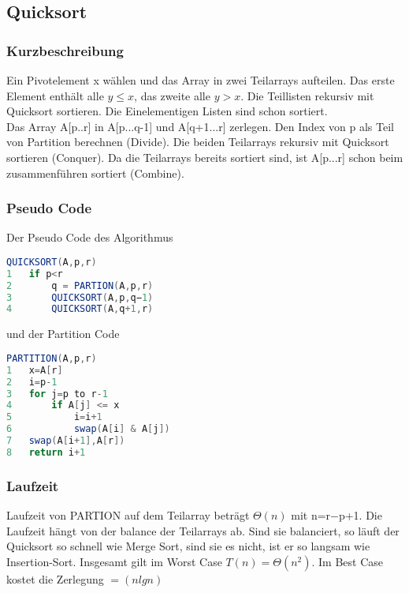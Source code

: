 \documentclass[jou,apacite]{apa6}
\begin{document}
\subsection{Quicksort}

\subsubsection{Kurzbeschreibung}
Ein Pivotelement x wählen und das Array in zwei Teilarrays aufteilen. Das erste Element enthält alle $y\le x$, das zweite alle $y>x$. Die Teillisten rekursiv mit Quicksort sortieren. Die Einelementigen Listen sind schon sortiert. \\
Das Array A[p..r] in A[p...q-1] und A[q+1...r] zerlegen. Den Index von p als Teil von Partition berechnen (Divide). Die beiden Teilarrays rekursiv mit Quicksort sortieren (Conquer). Da die Teilarrays bereits sortiert sind, ist A[p...r] schon beim zusammenführen sortiert (Combine). 

\subsubsection{Pseudo Code}
Der Pseudo Code des Algorithmus 
\begin{lstlisting}[language=Java]
QUICKSORT(A,p,r)
1   if p<r
2       q = PARTION(A,p,r)
3       QUICKSORT(A,p,q−1)
4       QUICKSORT(A,q+1,r)
\end{lstlisting}
und der Partition Code
\begin{lstlisting}[language=java]
PARTITION(A,p,r)
1   x=A[r]
2   i=p-1
3   for j=p to r-1
4       if A[j] <= x
5           i=i+1
6           swap(A[i] & A[j])
7   swap(A[i+1],A[r])
8   return i+1
\end{lstlisting}

\subsubsection{Laufzeit}
Laufzeit von PARTION auf dem Teilarray beträgt $\Theta(n)$ mit n=r−p+1. Die Laufzeit hängt von der balance der Teilarrays ab. Sind sie balanciert, so läuft der Quicksort so schnell wie Merge Sort, sind sie es nicht, ist er so langsam wie Insertion-Sort. Insgesamt gilt im Worst Case $T(n)=\Theta(n^2)$. Im Best Case kostet die Zerlegung $=(n lg n)$
\end{document}
